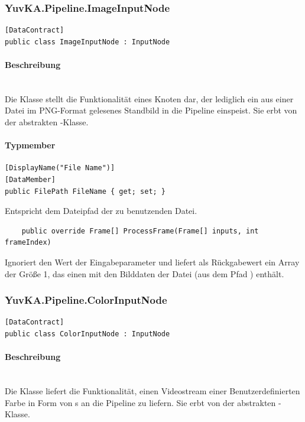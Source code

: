 \subsubsection{YuvKA.Pipeline.ImageInputNode}

\begin{verbatim}
[DataContract]
public class ImageInputNode : InputNode
\end{verbatim}

\paragraph{Beschreibung}~\\
Die Klasse  stellt die Funktionalität eines Knoten dar, der lediglich ein aus einer Datei im PNG-Format gelesenes Standbild in die Pipeline einspeist. Sie erbt von der abstrakten -Klasse.

\paragraph{Typmember}
\begin{itemize}

	\begin{verbatim}
[DisplayName("File Name")]
[DataMember]
public FilePath FileName { get; set; }
	\end{verbatim}
	Entspricht dem Dateipfad der zu benutzenden Datei.

	\begin{verbatim}
	public override Frame[] ProcessFrame(Frame[] inputs, int frameIndex)
	\end{verbatim}
	Ignoriert den Wert der Eingabeparameter und liefert als Rückgabewert ein Array der Größe 1, das einen  mit den Bilddaten der Datei (aus dem Pfad ) enthält.

\end{itemize}
\subsubsection{YuvKA.Pipeline.ColorInputNode}

\begin{verbatim}
[DataContract]
public class ColorInputNode : InputNode
\end{verbatim}

\paragraph{Beschreibung}~\\
Die Klasse  liefert die Funktionalität, einen Videostream einer Benutzerdefinierten Farbe in Form von s an die Pipeline zu liefern. Sie erbt von der abstrakten -Klasse.

